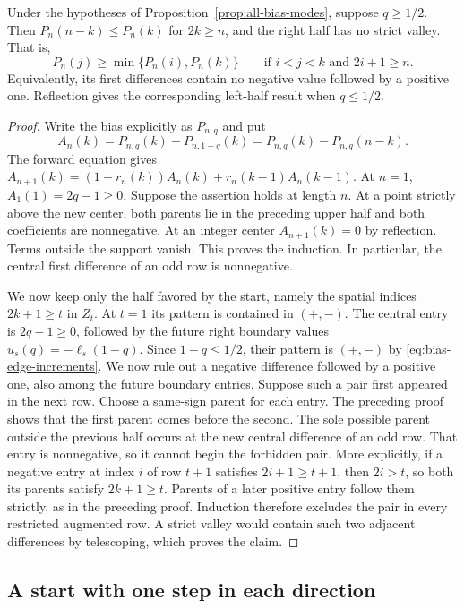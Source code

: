 \begin{proposition}\label{prop:dominant-half}
Under the hypotheses of Proposition~\ref{prop:all-bias-modes}, suppose
$q\ge1/2$. Then $P_n(n-k)\le P_n(k)$ for $2k\ge n$, and the right half has
no strict valley. That is,
\[
 P_n(j)\ge\min\{P_n(i),P_n(k)\}
 \qquad\text{if }i<j<k\text{ and }2i+1\ge n.
\]
Equivalently, its first differences contain no negative value followed
by a positive one. Reflection gives the corresponding left-half result
when $q\le1/2$.
\end{proposition}

\begin{proof}
Write the bias explicitly as $P_{n,q}$ and put
\[
 A_n(k)=P_{n,q}(k)-P_{n,1-q}(k)
       =P_{n,q}(k)-P_{n,q}(n-k).
\]
The forward equation gives
$A_{n+1}(k)=(1-r_n(k))A_n(k)+r_n(k-1)A_n(k-1)$.
At $n=1$, $A_1(1)=2q-1\ge0$. Suppose the assertion holds at
length $n$. At a point strictly above the new center, both parents lie in
the preceding upper half and both coefficients are nonnegative.
At an integer center $A_{n+1}(k)=0$ by reflection. Terms outside the
support vanish. This proves the induction. In particular, the
central first difference of an odd row is nonnegative.

We now keep only the half favored by the start, namely the spatial
indices $2k+1\ge t$ in $Z_t$. At $t=1$ its pattern is contained in $(+,-)$. The central entry is
$2q-1\ge0$, followed by the future right boundary values
$u_s(q)=-\ell_s(1-q)$. Since
$1-q\le1/2$, their pattern is $(+,-)$ by
\eqref{eq:bias-edge-increments}. We now rule out a negative difference followed by a positive one,
also among the future boundary entries. Suppose such a pair first
appeared in the next row. Choose a same-sign parent for each entry.
The preceding proof shows that the first parent comes before the second.
The sole possible parent outside the previous half occurs at the new
central difference of an odd row. That entry is nonnegative, so it
cannot begin the forbidden pair. More explicitly, if a negative entry
at index $i$ of row $t+1$ satisfies $2i+1\ge t+1$, then $2i>t$, so both its parents satisfy $2k+1\ge t$. Parents of a later positive
entry follow them strictly, as in the preceding proof. Induction
therefore excludes the pair in every restricted augmented row.
A strict valley would contain such two adjacent differences by
telescoping, which proves the claim.
\end{proof}

\subsection{A start with one step in each direction}


